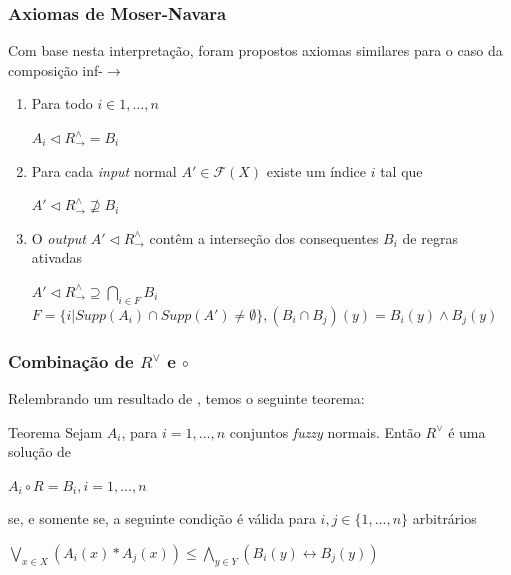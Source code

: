 \documentclass{beamer}
\theoremstyle{definition}
\begin{document}

\begin{frame}
\frametitle{Axiomas de Moser-Navara}
Com base nesta interpretação, foram propostos axiomas similares para o caso da composição inf-$\rightarrow$ \cite{p2}
\begin{enumerate}
\item Para todo $i \in {1,\dots,n}$
\begin{center}
$A_{i} \vartriangleleft R^{\wedge}_{\rightarrow} = B_{i}$
\end{center}

\hfill

\item Para cada \textit{input} normal $A' \in \mathcal{F}(X)$ existe um índice $i$ tal que
\begin{center}
$A' \vartriangleleft R^{\wedge}_{\rightarrow} \nsupseteq B_{i}$
\end{center}

\hfill

\item O \textit{output} $A' \vartriangleleft R^{\wedge}_{\rightarrow}$ contêm a interseção dos consequentes $B_{i}$ de regras ativadas
\begin{center}
$A' \vartriangleleft R^{\wedge}_{\rightarrow} \supseteq \bigcap\limits_{i \in F} B_{i}$\\
$F = \{i|Supp(A_{i})\cap Supp(A') \neq \emptyset\}, (B_{i} \cap B_{j})(y) = B_{i}(y) \wedge B_{j}(y)$
\end{center}
\end{enumerate}
\end{frame}


\begin{frame}
\frametitle{Combinação de $R^{\vee}$ e $\circ$}
Relembrando um resultado de \cite{p18}, temos o seguinte teorema:
\begin{block}{Teorema}
Sejam $A_{i}$, para $i=1,...,n$ conjuntos \textit{fuzzy} normais. Então $R^{\vee}$ é uma solução de
\begin{center}
$A_{i} \circ R = B_{i}, i=1,...,n$
\end{center}
se, e somente se, a seguinte condição é válida para $i,j \in \{1,...,n\}$ arbitrários
\begin{center}
$\bigvee\limits_{x \in X} (A_{i}(x) \ast A_{j}(x)) \leq \bigwedge\limits_{y \in Y} (B_{i}(y) \leftrightarrow B_{j}(y))$
\end{center}
\end{block}
\end{frame}
\end{document}
